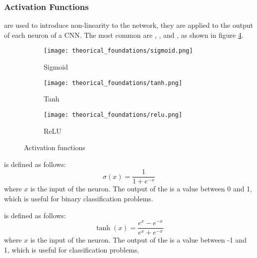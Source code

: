     \subsubsection{Activation Functions}

       are used to introduce non-linearity to the network,
      they are applied to the output of each neuron of a CNN\cite{goodfellow2016deep, intelligence2021modern}.
      The most common  are , , and
      , as shown in figure \ref{fig:activation_functions}.
      \begin{figure}[htbp]
        \centering
        \begin{subfigure}[b]{0.30\linewidth}
          \centering
          \texttt{[image: theorical\_foundations/sigmoid.png]}
          \caption{Sigmoid}
          \label{fig:sigmoid}
        \end{subfigure}
        \begin{subfigure}[b]{0.30\linewidth}
          \centering
          \texttt{[image: theorical\_foundations/tanh.png]}
          \caption{Tanh}
          \label{fig:tanh}
        \end{subfigure}
        \begin{subfigure}[b]{0.30\linewidth}
          \centering
          \texttt{[image: theorical\_foundations/relu.png]}
          \caption{ReLU}
          \label{fig:relu}
        \end{subfigure}
        \caption{Activation functions}
        \label{fig:activation_functions}
      \end{figure}

       is defined as follows\cite{goodfellow2016deep}:
      \begin{equation}
        \label{eq:sigmoid_activation_function}
        \sigma(x) = \frac{1}{1 + e^{-x}}
      \end{equation}
      where $x$ is the input of the neuron. The output of the  is a value between 0 and 1, which is useful for binary classification
      problems\cite{goodfellow2016deep, intelligence2021modern}.

       is defined as follows\cite{goodfellow2016deep}:
      \begin{equation}
        \label{eq:tanh_activation_function}
        \tanh(x) = \frac{e^{x} - e^{-x}}{e^{x} + e^{-x}}
      \end{equation}
      where $x$ is the input of the neuron. The output of the  is a value between -1 and 1, which is useful for classification
      problems\cite{goodfellow2016deep, intelligence2021modern}.


